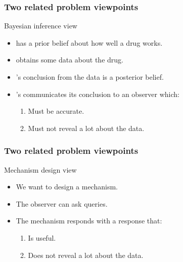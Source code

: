 \begin{frame}

  \frametitle{Two related problem viewpoints}
  \begin{block}{Bayesian inference view}
  \end{block}

  \begin{itemize}
  \item \Bay{} has a prior belief about how well a drug works.
  \item \Bay{} obtains some data about the drug.
  \item \Bay{}'s conclusion from the data is a posterior belief.
  \item \Bay{}'s communicates its conclusion to an observer which:
    \begin{enumerate}
    \item Must be accurate.
    \item Must not reveal a lot about the data.
    \end{enumerate}
  \end{itemize}
\end{frame}


\begin{frame}
  \frametitle{Two related problem viewpoints}
  \begin{block}{Mechanism design view}
  \end{block}
  \begin{itemize}
  \item We want to design a mechanism.
  \item The observer can ask queries.
  \item The mechanism responds with a response that:
    \begin{enumerate}
    \item Is useful.
    \item Does not reveal a lot about the data.
    \end{enumerate}
  \end{itemize}
\end{frame}


